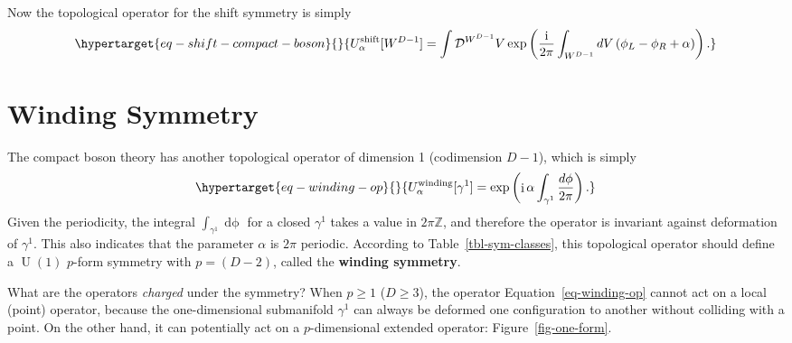 \documentclass[
  letterpaper,
  DIV=11,
  numbers=noendperiod]{scrreport}
\DeclareMathOperator{\U}{U}
\DeclareMathOperator{\imunit}{i}
\newcommand{\stdim}{D}
\begin{document}
Now the topological operator for the shift symmetry is simply
\begin{equation}\protect\hypertarget{eq-shift-compact-boson}{}{
    U_\alpha^\text{shift}[{W^{\stdim-1}}] = \int \mathcal{D}^{W^{\stdim-1}}V \exp\left(\frac{\imunit}{2\pi}\int_{W^{\stdim-1}} \mathop{dV}\left(\phi_L-\phi_R + \alpha\right)\right).
}\label{eq-shift-compact-boson}\end{equation}

\hypertarget{winding-symmetry}{%
\section{Winding Symmetry}\label{winding-symmetry}}

The compact boson theory has another topological operator of dimension 1
(codimension \(\stdim-1\)), which is simply
\begin{equation}\protect\hypertarget{eq-winding-op}{}{
U^\text{winding}_\alpha[\gamma^1] = \exp\left(\imunit\alpha \int_{\gamma^1}\frac{\mathop{d\phi}}{2\pi}\right).
}\label{eq-winding-op}\end{equation} Given the periodicity, the integral
\(\int_{\gamma^1}\mathop{d\phi}\) for a closed \(\gamma^1\) takes a
value in \(2\pi \mathbb{Z}\), and therefore the operator is invariant
against deformation of \(\gamma^1\). This also indicates that the
parameter \(\alpha\) is \(2\pi\) periodic. According to
Table~\ref{tbl-sym-classes}, this topological operator should define a
\(\U(1)\) \(p\)-form symmetry with \(p=(\stdim-2)\), called the
\textbf{winding symmetry}.

What are the operators \emph{charged} under the symmetry? When
\(p \ge 1\) (\(\stdim\ge 3\)), the operator Equation~\ref{eq-winding-op}
cannot act on a local (point) operator, because the one-dimensional
submanifold \(\gamma^1\) can always be deformed one configuration to
another without colliding with a point. On the other hand, it can
potentially act on a \(p\)-dimensional extended operator:
Figure~\ref{fig-one-form}.
\end{document}
